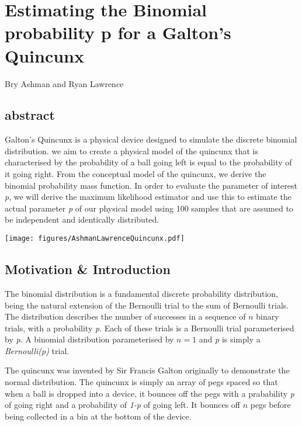 \section{Estimating the Binomial probability p for a Galton's Quincunx}\label{S:AshmanLawrenceQuincunx}

\begin{center}
Bry Ashman and Ryan Lawrence
\end{center}

\subsection*{abstract}
Galton's Quincunx is a physical device designed to simulate the discrete binomial distribution. we aim to create a physical model of the quincunx that is characterised by the probability of a ball going left is equal to the probability of it going right. From the conceptual model of the quincunx, we derive the binomial probability mass function. In order to evaluate the parameter of interest \textit{p}, we will derive the maximum likelihood estimator and use this to estimate the actual parameter \textit{p} of our physical model using 100 samples that are assumed to be independent and identically distributed.
\begin{center}
\texttt{[image: figures/AshmanLawrenceQuincunx.pdf]}
\end{center}

\subsection{Motivation \& Introduction}
The binomial distribution is a fundamental discrete probability distribution, being the natural extension of the Bernoulli trial to the sum of Bernoulli trials. The distribution describes the number of successes in a sequence of $n$ binary trials, with a probability \textit{p}. Each of these trials is a Bernoulli trial parameterised by \textit{p}. A binomial distribution parameterised by $n=1$ and \textit{p} is simply a \textit{Bernoulli(p)} trial.

The quincunx was invented by Sir Francis Galton originally to demonstrate the normal distribution. The quincunx is simply an array of pegs spaced so that when a ball is dropped into a device, it bounces off the pegs with a prabability \textit{p} of going right and a probability of \textit{1-p} of going left. It bounces off $n$ pegs before being collected in a bin at the bottom of the device.

